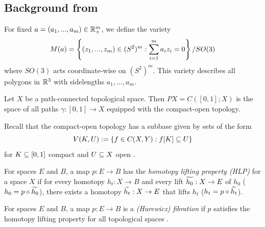 \subsection{Background from \cite{farber2006topology}}\label{sec:bg-farber}

\begin{definition}
    For fixed $a = (a_1,...,a_m) \in \Rp^m$, we define the variety
    \[
        M(a) = \set{(z_1,...,z_m) \in (S^2)^m : \sum_{i = 1}^m a_i z_i = 0}/ SO (3)
    \]
    where $SO(3)$ acts coordinate-wise on $(S^2)^m$.
    This variety describes all polygons in $\R^3$ with sidelengths $a_1,...,a_m$.
\end{definition}

\begin{definition}
    Let $X$ be a path-connected topological space.
    Then $PX = C([0,1];X)$ is the space of all paths $\gamma : [0,1] \to X$ equipped with the compact-open topology.
    
    Recall that the compact-open topology has a subbase given by sets of the form
    \[
    V(K,U) := \set{f \in C(X,Y) : f[K] \sub U}
    \]
    for $K \sub [0,1]$ compact and $U \sub X$ open \cite{wikipedia:compact-open}.
\end{definition}

\begin{definition}
    For spaces $E$ and $B$, a map $p : E \to B$ has the \emph{homotopy lifting property (HLP)} for a space $X$ if for every homotopy $h_t : X \to B$ and every lift $\Tilde{h_0} : X \to E$ of $h_0$ ($h_0 = p \circ \Tilde{h_0}$), there exists a homotopy $\Tilde{h_t} : X \to E$ that lifts $h_t$ ($h_t = p \circ \Tilde{h_t}$).
\end{definition}

\begin{definition}
    For spaces $E$ and $B$, a map $p : E \to B$ is a \emph{(Hurewicz) fibration} if $p$ satisfies the homotopy lifting property for all topological spaces \cite{wikipedia:fibration}.
\end{definition}

